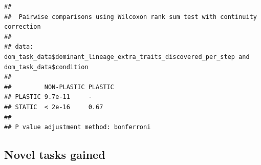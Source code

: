 \documentclass[]{book}
\newenvironment{Shaded}{\begin{snugshade}}{\end{snugshade}}
\newcommand{\DataTypeTok}[1]{\textcolor[rgb]{0.13,0.29,0.53}{#1}}
\newcommand{\FloatTok}[1]{\textcolor[rgb]{0.00,0.00,0.81}{#1}}
\newcommand{\KeywordTok}[1]{\textcolor[rgb]{0.13,0.29,0.53}{\textbf{#1}}}
\newcommand{\NormalTok}[1]{#1}
\newcommand{\OperatorTok}[1]{\textcolor[rgb]{0.81,0.36,0.00}{\textbf{#1}}}
\newcommand{\OtherTok}[1]{\textcolor[rgb]{0.56,0.35,0.01}{#1}}
\newcommand{\StringTok}[1]{\textcolor[rgb]{0.31,0.60,0.02}{#1}}
\begin{document}
\begin{Shaded}
\end{Shaded}

\begin{verbatim}
## 
##  Pairwise comparisons using Wilcoxon rank sum test with continuity correction 
## 
## data:  dom_task_data$dominant_lineage_extra_traits_discovered_per_step and dom_task_data$condition 
## 
##         NON-PLASTIC PLASTIC
## PLASTIC 9.7e-11     -      
## STATIC  < 2e-16     0.67   
## 
## P value adjustment method: bonferroni
\end{verbatim}

\hypertarget{novel-tasks-gained}{%
\subsection{Novel tasks gained}\label{novel-tasks-gained}}
\end{document}

